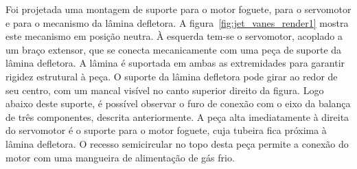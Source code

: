 Foi projetada uma montagem de suporte para o motor foguete, para o servomotor e para o mecanismo da lâmina defletora. A figura~\ref{fig:jet_vanes_render1} mostra este mecanismo em posição neutra. À esquerda tem-se o servomotor, acoplado a um braço extensor, que se conecta mecanicamente com uma peça de suporte da lâmina defletora. A lâmina é suportada em ambas as extremidades para garantir rigidez estrutural à peça. O suporte da lâmina defletora pode girar ao redor de seu centro, com um mancal visível no canto superior direito da figura. Logo abaixo deste suporte, é possível observar o furo de conexão com o eixo da balança de três componentes, descrita anteriormente. A peça alta imediatamente à direita do servomotor é o suporte para o motor foguete, cuja tubeira fica próxima à lâmina defletora. O recesso semicircular no topo desta peça permite a conexão do motor com uma mangueira de alimentação de gás frio.

